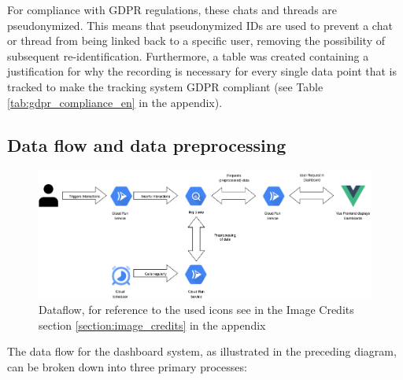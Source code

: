 \documentclass[
	english,
	ruledheaders=section,%
	class=report,%
	thesis={type=bachelor},%
	accentcolor=1b,%
	custommargins=true,%
	marginpar=false,%
	parskip=half-,%
	fontsize=11pt,%
	DIV=14,
]{tudapub}
\begin{document}
For compliance with GDPR \parencite{GDPR_2016} regulations, these chats and threads are pseudonymized. This means that pseudonymized IDs are used to prevent a chat or thread from being linked back to a specific user, removing the possibility of subsequent re-identification. Furthermore, a table was created containing a justification for why the recording is necessary for every single data point that is tracked to make the tracking system GDPR compliant (see Table \ref{tab:gdpr_compliance_en} in the appendix).
\subsection{Data flow and data preprocessing}
\begin{figure}
    \centering
    \includegraphics[width=1\linewidth]{images/DataFlow_Bachelorthesis.drawio.png}
    \caption{Dataflow, for reference to the used icons see in the Image Credits section \ref{section:image_credits} in the appendix}
    \label{fig:enter-label}
\end{figure}
The data flow for the dashboard system, as illustrated in the preceding diagram, can be broken down into three primary processes:
\end{document}

